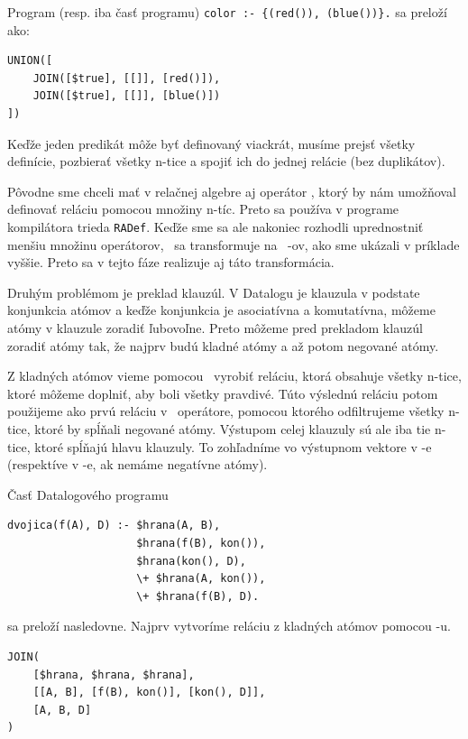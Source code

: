 \begin{priklad}
    Program (resp. iba časť programu) \verb|color :- {(red()), (blue())}.| sa preloží ako:
\begin{verbatim}
UNION([
    JOIN([$true], [[]], [red()]),
    JOIN([$true], [[]], [blue()])
])
\end{verbatim}
\end{priklad}

Keďže jeden predikát môže byť definovaný viackrát, musíme prejsť všetky definície, pozbierať všetky
n-tice a spojiť ich do jednej relácie (bez duplikátov). 

Pôvodne sme chceli mať v relačnej algebre aj operátor \DEF, ktorý by nám umožňoval definovať reláciu
pomocou množiny n-tíc. Preto sa používa v programe kompilátora trieda \texttt{RADef}. Keďže sme sa
ale nakoniec rozhodli uprednostniť menšiu množinu operátorov, \DEF\ sa transformuje na \UNION\
\JOIN-ov, ako sme ukázali v príklade vyššie. Preto sa v tejto fáze realizuje aj táto transformácia.

\vline

Druhým problémom je preklad klauzúl. V Datalogu je klauzula v podstate konjunkcia atómov a keďže
konjunkcia je asociatívna a komutatívna, môžeme atómy v klauzule zoradiť ľubovoľne. Preto môžeme
pred prekladom klauzúl zoradiť atómy tak, že najprv budú kladné atómy a až potom negované atómy.

Z kladných atómov vieme pomocou \JOIN\ vyrobiť reláciu, ktorá obsahuje všetky n-tice, ktoré môžeme
doplniť, aby boli všetky pravdivé. Túto výslednú reláciu potom použijeme ako prvú
reláciu v \ANTIJOIN\ operátore, pomocou ktorého odfiltrujeme všetky n-tice, ktoré by spĺňali
negované atómy. Výstupom celej klauzuly sú ale iba tie n-tice, ktoré spĺňajú hlavu klauzuly. To
zohľadníme vo výstupnom vektore v \ANTIJOIN-e (respektíve v \JOIN-e, ak nemáme negatívne atómy).

\vline

Časť Datalogového programu
\begin{verbatim}
dvojica(f(A), D) :- $hrana(A, B),
                    $hrana(f(B), kon()), 
                    $hrana(kon(), D),
                    \+ $hrana(A, kon()),
                    \+ $hrana(f(B), D).
\end{verbatim}
sa preloží nasledovne. Najprv vytvoríme reláciu z kladných atómov pomocou \JOIN-u.

\begin{verbatim}
JOIN(
    [$hrana, $hrana, $hrana],
    [[A, B], [f(B), kon()], [kon(), D]],
    [A, B, D]
)
\end{verbatim}

